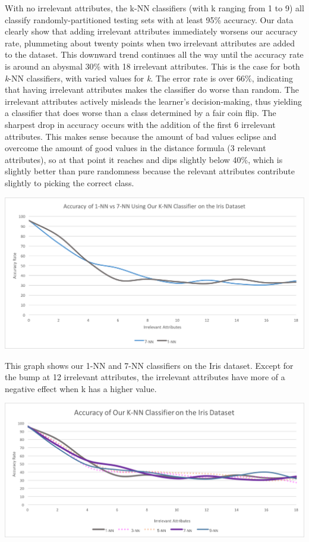 \documentclass{article}
\begin{document}
With no irrelevant attributes, the k-NN classifiers (with k ranging from 1 to 9) all classify randomly-partitioned testing sets with at least 95\% accuracy. Our data clearly show that adding irrelevant attributes immediately worsens our accuracy rate, plummeting about twenty points when two irrelevant attributes are added to the dataset. This downward trend continues all the way until the accuracy rate is around an abysmal 30\% with 18 irrelevant attributes. This is the case for both\textit{ k}-NN classifiers, with varied values for \textit{k}. The error rate is over 66\%, indicating that having irrelevant attributes makes the classifier do worse than random. The irrelevant attributes actively misleads the learner's decision-making, thus yielding a classifier that does worse than a class determined by a fair coin flip. The sharpest drop in accuracy occurs with the addition of the first 6 irrelevant attributes. This makes sense because the amount of bad values eclipse and overcome the amount of good values in the distance formula (3 relevant attributes), so at that point it reaches and dips slightly below 40\%, which is slightly better than pure randomness because the relevant attributes contribute slightly to picking the correct class.

\begin{center}
\includegraphics[scale=0.7]{our-knn-iris} \\
\end{center}

This graph shows our 1-NN and 7-NN classifiers on the Iris dataset. Except for the bump at 12 irrelevant attributes, the irrelevant attributes have more of a negative effect when k has a higher value. \\

\begin{center}
\includegraphics[scale=0.7]{our-knn-iris-full} \\
\end{center}
\end{document}
